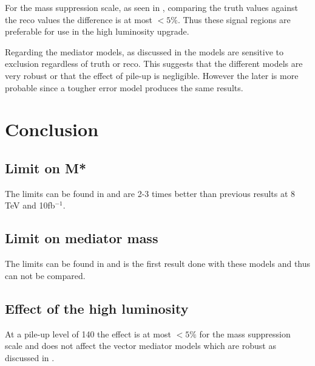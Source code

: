 For the mass suppression scale, as seen in , comparing the truth values against the reco values the difference is at most $<5 \% $. Thus these signal regions are preferable for use in the high luminosity upgrade. 

Regarding the mediator models, as discussed in  the models are sensitive to exclusion regardless of truth or reco. This suggests that the different models are very robust or that the effect of pile-up is negligible. However the later is more probable since a tougher error model produces the same results.

\newpage
\section{Conclusion}
\subsection{Limit on M*}
The limits can be found in  and are 2-3 times better than previous results at 8 TeV and 10fb$^{-1}$.

\subsection{Limit on mediator mass}
The limits can be found in  and is the first result done with these models and thus can not be compared.

\subsection{Effect of the high luminosity}
At a pile-up level of 140 the effect is at most $<5\%$ for the mass suppression scale and does not affect the vector mediator models which are robust as discussed in .